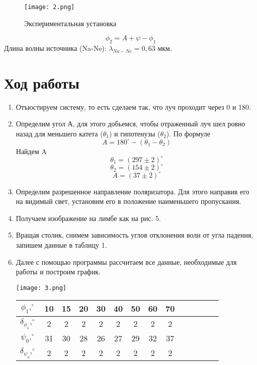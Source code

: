 \documentclass[a4paper, 12pt]{article}%
\begin{document}
\begin{figure}[h]
\begin{center}
\texttt{[image: 2.png]}
\caption{Экспериментальная установка}
\end{center}
\end{figure}
\begin{equation}
\phi_2 = A + \psi - \phi_1
\end{equation}
Длина волны источника (Na-Ne): $\lambda_{Na-Ne} = 0,63$ мкм.
\section*{Ход работы}
\begin{enumerate}
\item Отъюстируем систему, то есть сделаем так, что луч проходит через 0 и 180.
\item Определим угол А, для этого добьемся, чтобы отраженный луч шел ровно назад для меньшего катета ($\theta_1$) и гипотенузы ($\theta_2$). По формуле 
\[A = 180^{\circ} - (\theta_1 - \theta_2)\]
Найдем A
\[\theta_1 = (297 \pm 2)^{\circ}\]
\[\theta_2 = (154 \pm 2)^{\circ}\]
\[A = (37 \pm 2)^{\circ}\]
\item Определим разрешенное направление поляризатора. Для этого направив его на видимый свет, установим его в положение наименьшего пропускания.
\item Получаем изображение на лимбе как на рис. 5.
\item Вращая столик, снимем зависимость углов отклонения волн от угла падения, запишем данные в таблицу 1.
\item Далее с помощью программы рассчитаем все данные, необходимые для работы и построим график.
  \begin{center}
    \texttt{[image: 3.png]}
  \end{center}
\begin{center}
\begin{tabular}{|c|c|c|c|c|c|c|c|c|c|c|c|c|c|}
\hline
$\phi_1, ^{\circ}$             & 10     & 15     & 20     & 30    & 40    & 50     & 60    & 70    \\ \hline
$\delta_{\phi_1}, ^{\circ}$    & 2      & 2      & 2     & 2     & 2     & 2     & 2     & 2     \\ \hline
$\psi_0, ^{\circ}$             & 31     & 30     & 28   & 26     & 27    & 29     & 32    & 37    \\ \hline
$\delta_{\psi_o},  ^{\circ}$   & 2      & 2      & 2     & 2     & 2     & 2     & 2     & 2     \\ \hline

\end{tabular}
\end{center}
\end{enumerate}
\end{document}
